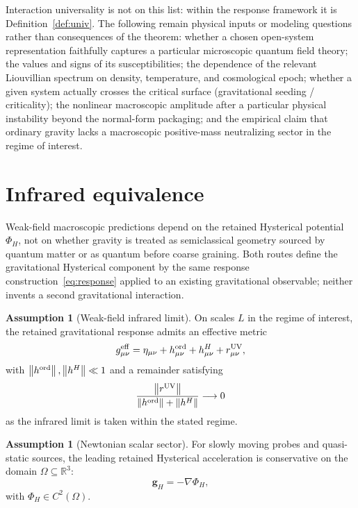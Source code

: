 \documentclass[11pt]{article}
\theoremstyle{definition}
\newtheorem{assumption}[theorem]{Assumption}
\theoremstyle{remark}
\newcommand{\R}{\mathbb R}
\newcommand{\norm}[1]{\left\lVert #1\right\rVert}
\begin{document}
Interaction universality is not on this list: within the response framework it is Definition~\ref{def:univ}. The following remain physical inputs or modeling questions rather than consequences of the theorem: whether a chosen open-system representation faithfully captures a particular microscopic quantum field theory; the values and signs of its susceptibilities; the dependence of the relevant Liouvillian spectrum on density, temperature, and cosmological epoch; whether a given system actually crosses the critical surface (gravitational seeding / criticality); the nonlinear macroscopic amplitude after a particular physical instability beyond the normal-form packaging; and the empirical claim that ordinary gravity lacks a macroscopic positive-mass neutralizing sector in the regime of interest.


\section{Infrared equivalence}
\label{sec:ir}
Weak-field macroscopic predictions depend on the retained Hysterical potential $\Phi_H$, not on whether gravity is treated as semiclassical geometry sourced by quantum matter or as quantum before coarse graining.
Both routes define the gravitational Hysterical component by the same response construction~\eqref{eq:response} applied to an existing gravitational observable; neither invents a second gravitational interaction.

\begin{assumption}[Weak-field infrared limit]\label{ass:ir}
On scales $L$ in the regime of interest, the retained gravitational response admits an effective metric
\begin{equation}
 g_{\mu\nu}^{\rm eff}=\eta_{\mu\nu}+h_{\mu\nu}^{\rm ord}+h_{\mu\nu}^{H}+r_{\mu\nu}^{\rm UV},
\end{equation}
with $\norm{h^{\rm ord}},\norm{h^H}\ll1$ and a remainder satisfying
\begin{equation}
 \frac{\norm{r^{\rm UV}}}{\norm{h^{\rm ord}}+\norm{h^H}}\longrightarrow0
\end{equation}
as the infrared limit is taken within the stated regime.
\end{assumption}

\begin{assumption}[Newtonian scalar sector]\label{ass:newton}
For slowly moving probes and quasi-static sources, the leading retained Hysterical acceleration is conservative on the domain $\Omega\subseteq\R^3$:
\begin{equation}
 \mathbf g_H=-\nabla\Phi_H,
 \label{eq:potential}
\end{equation}
with $\Phi_H\in C^2(\Omega)$.
\end{assumption}
\end{document}
